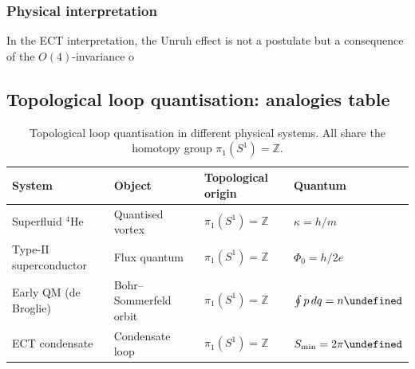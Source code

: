\documentclass[11pt,a4paper]{article}
\let\hbar\undefined
\numberwithin{equation}{section}
\begin{document}
\subsubsection{Physical interpretation}

In the ECT interpretation, the Unruh effect is not a postulate but a
consequence of the $O(4)$-invariance o

\subsection{Topological loop quantisation: analogies table}
\label{sec:loops_analogy_section}

\begin{table}[h]
\centering
\caption{Topological loop quantisation in different physical systems.
All share the homotopy group $\pi_1(S^1)=\mathbb{Z}$.}
\label{tab:loops_analogy}
\begin{tabular}{llll}
\hline\hline
System & Object & Topological origin & Quantum \\
\hline
Superfluid $^4$He~\cite{Donnelly1991} & Quantised vortex & $\pi_1(S^1)=\mathbb{Z}$ & $\kappa=h/m$ \\
Type-II superconductor & Flux quantum & $\pi_1(S^1)=\mathbb{Z}$ & $\Phi_0=h/2e$ \\
Early QM (de Broglie) & Bohr--Sommerfeld orbit & $\pi_1(S^1)=\mathbb{Z}$ & $\oint p\,dq=n\hbar$ \\
ECT condensate & Condensate loop & $\pi_1(S^1)=\mathbb{Z}$ & $S_{\min}=2\pi\hbar$ \\
\hline\hline
\end{tabular}
\end{table}
\end{document}
